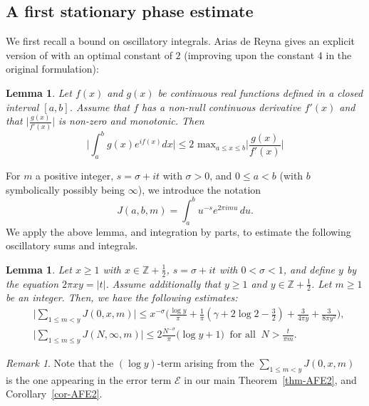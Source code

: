 \documentclass[11pt,letterpaper,oneside,reqno]{amsart}
\renewcommand{\^}[1]{\widehat{#1}}
\newcommand{\Z}{{\mathbb{Z}}}
\numberwithin{equation}{section}
\newtheorem{lemma}[theorem]{Lemma}
\theoremstyle{remark}
\newtheorem*{remark}{Remark}
\newcommand*{\thmref}[1]{Theorem~\ref{#1}}
\newcommand*{\corref}[1]{Corollary~\ref{#1}}
\begin{document}
\subsection{A first stationary phase estimate}
We first recall a bound on oscillatory integrals. Arias de Reyna gives an explicit version of \cite[Lemma 4.3]{Titchmarsh} with an optimal constant of $2$ (improving upon the constant $4$ in the original formulation):
\begin{lemma} \cite[Lemma 2]{dereyna2024approximationzetafunctiondirichlet}\label{Lemma 2 arias}
    Let $f(x)$ and $g(x)$ be continuous real functions defined in a closed interval $[a,b]$. Assume that $f$ has a non-null continuous derivative $f'(x)$ and that $\Big| \frac{g(x)}{f'(x)}\Big| $ is non-zero and monotonic. Then 
    \begin{equation}
        \bigg|\int_a^bg(x)e^{if(x)}dx\bigg|\le2\text{ max}_{a\leq x\leq b} \bigg| \frac{g(x)}{f'(x)}\bigg| 
    \end{equation}
\end{lemma}
For $m$ a positive integer, $s=\sigma + i t $ with $\sigma>0$, and $0\le a<b$ (with $b$ symbolically possibly being $\infty$), we introduce the notation 
\begin{equation}\label{def-intJabm}
J(a,b,m) = \int_a^b u^{-s} e^{2\pi i m u} \,du.    
\end{equation}
We apply the above lemma, and integration by parts, to 
estimate the following oscillatory sums and integrals. 
%
\begin{lemma}\label{lem:u-s}
    Let $x\ge 1$ with $x\in\Z+\frac{1}{2}$,  $s=\sigma+it$ with $0<\sigma<1$, and define $y$ by the equation $2\pi x y = |t|$. Assume additionally that $y\ge  1$ and $y\in \Z+\frac{1}{2}$. Let  $m\ge 1$ be an integer. 
    Then, we have the following estimates:
\begin{align}  
& \bigg|\sum_{1 \leq m < y }J(0,x,m)\bigg| \le x^{-\sigma} \Bigg( 
%
\frac{\log y }{ \pi } + \frac{1}{\pi}\left(\gamma+2\log 2-\frac{3}{2}\right)  +\frac{3}{4\pi y} + \frac{3}{8\pi y^2}
\Bigg),\label{est I2}
\\ &
\bigg|  \sum_{1 \leq m \leq y } J(N,\infty,m) \bigg|  
\leq 2 \frac{N^{-\sigma}}{\pi} \big(\log y + 1  \big)\ \text{ for all }\ N>\frac{t}{\pi m}.
 \label{est I3}
\end{align}
\end{lemma}
%
\begin{remark}
Note that the $(\log y)$-term arising from the $\sum_{1\le m<y} J(0,x,m)$ is the one appearing in the error term $\mathcal{E}$ in our main \thmref{thm-AFE2}, and \corref{cor-AFE2}.
\end{remark}
\end{document}
